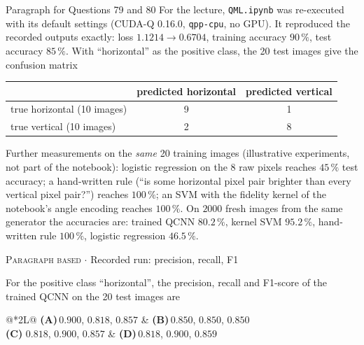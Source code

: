\documentclass[11pt,a4paper]{article}
\newcommand{\optlabel}[1]{\textbf{(#1)}}
\newcommand{\correctlabel}[1]{\textcolor{okgreen}{\textbf{(#1)}\,\ding{51}}}
\newenvironment{qitem}[1]{\begin{list}{}{\setlength{\leftmargin}{3.3em}\setlength{\labelwidth}{3.1em}%
  \setlength{\labelsep}{0.2em}\setlength{\topsep}{3pt}\setlength{\parsep}{3pt}}\item[\textbf{Q.#1}\hfill]}{\end{list}}
\newcommand{\qmeta}[2]{{\footnotesize\color{black!60}\textsc{#1} \;$\cdot$\; #2}\par}
\begin{document}
\begin{passagebox}{Paragraph for Questions 79 and 80}
For the lecture, \texttt{QML.ipynb} was re-executed with its default settings (CUDA-Q 0.16.0, \texttt{qpp-cpu}, no GPU).
It reproduced the recorded outputs exactly: loss $1.1214 \to 0.6704$, training accuracy $90\,\%$, test accuracy $85\,\%$.
With ``horizontal'' as the positive class, the 20 test images give the confusion matrix
\begin{center}\small
\begin{tabular}{lcc}\toprule & predicted horizontal & predicted vertical\\ \midrule
true horizontal (10 images) & 9 & 1\\ true vertical (10 images) & 2 & 8\\ \bottomrule\end{tabular}
\end{center}
Further measurements on the \emph{same} 20 training images (illustrative experiments, not part of the notebook):
logistic regression on the 8 raw pixels reaches $45\,\%$ test accuracy; a hand-written rule (``is some horizontal pixel pair
brighter than every vertical pixel pair?'') reaches $100\,\%$; an SVM with the fidelity kernel of the notebook's angle encoding
reaches $100\,\%$. On $2000$ fresh images from the same generator the accuracies are: trained QCNN $80.2\,\%$, kernel SVM
$95.2\,\%$, hand-written rule $100\,\%$, logistic regression $46.5\,\%$.
\end{passagebox}
\begin{qitem}{79}
\qmeta{Paragraph based}{Recorded run: precision, recall, F1}
For the positive class ``horizontal'', the precision, recall and F1-score of the trained QCNN on the 20 test images are
\par\smallskip\noindent\begin{tabularx}{\linewidth}{@{}*{2}{L}@{}}
\optlabel{A}\,$0.900$, $0.818$, $0.857$ & \optlabel{B}\,$0.850$, $0.850$, $0.850$ \\[3pt]
\correctlabel{C}\,$0.818$, $0.900$, $0.857$ & \optlabel{D}\,$0.818$, $0.900$, $0.859$
\end{tabularx}
\end{qitem}
\end{document}
